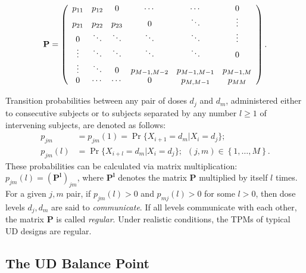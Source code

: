 \begin{equation}\label{eq:genericPmat}
\bf{P}=\left(
\begin{array}{cccccc}
  p_{11}& p_{12} & 0 & \cdots & \cdots & 0 \\
  p_{21} & p_{22} & p_{23} & 0 & \ddots & \vdots \\
  0 & \ddots & \ddots & \ddots & \ddots & \vdots \\
  \vdots & \ddots & \ddots & \ddots & \ddots & 0 \\
  \vdots & \ddots & 0 & p_{M-1,M-2} & p_{M-1,M-1} & p_{M-1,M} \\
  0 & \cdots & \cdots & 0 & p_{M,M-1} & p_{MM}\\
\end{array}
\right).
\end{equation}

Transition probabilities between any pair of doses $d_j$ and $d_m$, administered either to consecutive subjects or to subjects separated by any number $l\geq 1$ of intervening subjects, are denoted as follows:
\begin{equation*}
\begin{array}{rl}
p_{jm}&=p_{jm}(1)=\Pr\{X_{i+1}=d_m|X_i=d_j\};\\
p_{jm}(l)&=\Pr\{X_{i+l}=d_m|X_i=d_j\};\,\,\,(j,m)\in\left\{1,\ldots,M\right\}.
\end{array}
\end{equation*}
These probabilities can be calculated via matrix multiplication: $p_{jm}(l)=\left(\mathbf{P^l}\right)_{jm}$, where $\mathbf{P^l}$ denotes the matrix $\mathbf{P}$ multiplied by itself $l$ times. For a given $j,m$ pair, if $p_{jm}(l)>0$ and $p_{mj}(l)>0$  for some $l>0$, then dose levels $d_j,d_m$ are said to \emph{communicate}. If all levels communicate with each other, the matrix $\mathbf{P}$ is called \emph{regular}. Under realistic conditions, the TPMs of typical UD designs are regular.


\subsection{The UD Balance Point}\label{sec:balpoint}

